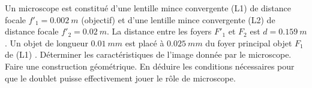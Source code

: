%
\begin{exercice}[Microscope]
Un microscope est constitué d'une lentille mince convergente (L1) de distance focale \(f'_1 = \SI{0,002}{m}\) (objectif) et d'une lentille mince convergente (L2) de distance focale \(f'_2 = \SI{0,02}{m}\). La distance entre les foyers \(F'_1\) et \(F_2\) est \(d = \SI{0,159}{m}\). Un objet de longueur \(\SI{0,01}{mm}\) est placé à \(\SI{0,025}{mm}\) du foyer principal objet \(F_1\) de (L1) . Déterminer les caractéristiques de l'image donnée par le microscope. Faire une construction géométrique. En déduire les conditions nécessaires pour que le doublet puisse effectivement jouer le rôle de microscope.
\end{exercice}

